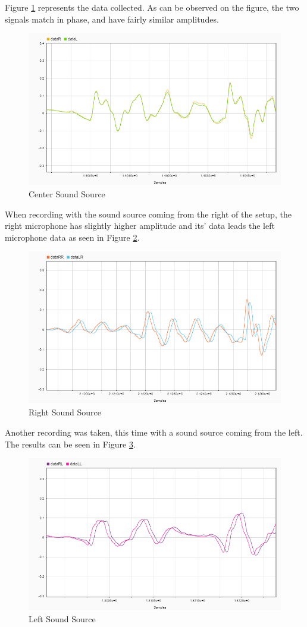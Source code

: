 Figure \ref{fig:C} represents the data collected. As can be observed on the figure, 
the two signals match in phase, and have fairly similar amplitudes.
\begin{figure}[htp]
  \centering
  \includegraphics[width=0.8\linewidth]{Illustrations/DataC.png}
  \caption{Center Sound Source}
  \label{fig:C}
\end{figure}

\newpage

When recording with the sound source coming from the right of the setup, the right 
microphone has slightly higher amplitude and its' data leads the left microphone 
data as seen in Figure \ref{fig:R}.

\begin{figure}[htp]
  \centering
  \includegraphics[width=0.8\linewidth]{Illustrations/DataR.png}
  \caption{Right Sound Source}
  \label{fig:R}
\end{figure}

Another recording was taken, this time with a sound source coming from the left. 
The results can be seen in Figure \ref{fig:L}.

\begin{figure}[htp]
  \centering
  \includegraphics[width=0.8\linewidth]{Illustrations/DataL.png}
  \caption{Left Sound Source}
  \label{fig:L}
\end{figure}


